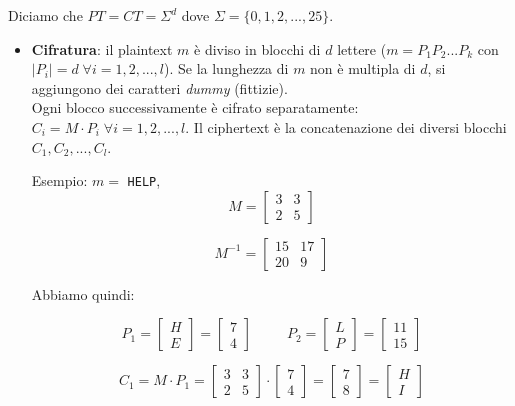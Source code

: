 Diciamo che $PT=CT=\Sigma^d$ dove $\Sigma=\{0, 1, 2,..., 25\}$.
\begin{itemize}
	\item \textbf{Cifratura}: il plaintext $m$ è diviso in blocchi di $d$ lettere ($m=P_1P_2...P_k$ con $|P_i|=d \; \forall i=1,2,...,l$).
	Se la lunghezza di $m$ non è multipla di $d$, si aggiungono dei caratteri \textit{dummy} (fittizie).\\
	Ogni blocco successivamente è cifrato separatamente: $C_i=M \cdot P_i \; \forall i = 1,2,...,l$. Il ciphertext è la concatenazione dei diversi blocchi $C_1, C_2, ..., C_l$.
	
	Esempio:
	$m =$ \texttt{HELP},
	\begin{equation*}
	M = \begin{bmatrix}
	3 & 3\\
	2 & 5
	\end{bmatrix}
	\end{equation*}
	
	\begin{equation*}
	M^{-1} = \begin{bmatrix}
    15 & 17\\
	20 & 9
	\end{bmatrix}
	\end{equation*}
	
	Abbiamo quindi:

	\[
	P_1 = \begin{bmatrix}
	H\\
	E
	\end{bmatrix}
	=
	\begin{bmatrix}
	7\\
	4
	\end{bmatrix}
	\;\;\;\;\;\;\;\;\;
	P_2 = \begin{bmatrix}
	L\\
	P
	\end{bmatrix}
	=
	\begin{bmatrix}
	11\\
	15
	\end{bmatrix}
	\]	
	
	\[
	C_1= M \cdot P_1 = \begin{bmatrix}
	3 & 3\\
	2 & 5
	\end{bmatrix} 
	\cdot \begin{bmatrix}
	7 \\
	4
	\end{bmatrix}
	=
	\begin{bmatrix}
	7\\
	8
	\end{bmatrix}
		=
	\begin{bmatrix}
	H\\
	I
	\end{bmatrix}
	\]
	

\end{itemize}

